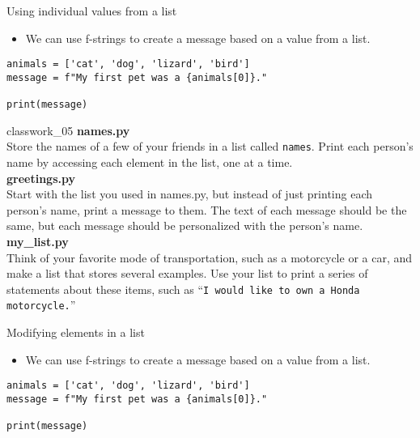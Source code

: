 \documentclass[aspectratio=169]{beamer}
\begin{document}
\begin{frame}[fragile]{Using individual values from a list}
    \begin{itemize}[label=--,itemsep=15pt]
        \item We can use f-strings to create a message based on a value from a list.
    \end{itemize}
    \vspace{15pt}
    \begin{verbatim}
animals = ['cat', 'dog', 'lizard', 'bird']
message = f"My first pet was a {animals[0]}."

print(message)
    \end{verbatim}
\end{frame}


\begin{frame}[fragile]{classwork\_05}
    \textbf{names.py} \\
    Store the names of a few of your friends in a list called \texttt{names}.
    Print each person’s name by accessing each element in the list, one at a time. \\
    \vspace{10pt}
    \textbf{greetings.py} \\
    Start with the list you used in names.py, but instead of just printing each person’s name, print a message to them.
    The text of each message should be the same, but each message should be personalized with the person’s name. \\
    \vspace{10pt}
    \textbf{my\_list.py} \\
    Think of your favorite mode of transportation, such as a motorcycle or a car, and make a list that stores several examples.
    Use your list to print a series of statements about these items, such as ``\texttt{I would like to own a Honda motorcycle.}''
\end{frame}


\begin{frame}[fragile]{Modifying elements in a list}
    \begin{itemize}[label=--,itemsep=15pt]
        \item We can use f-strings to create a message based on a value from a list.
    \end{itemize}
    \vspace{15pt}
    \begin{verbatim}
animals = ['cat', 'dog', 'lizard', 'bird']
message = f"My first pet was a {animals[0]}."

print(message)
    \end{verbatim}
\end{frame}
\end{document}
